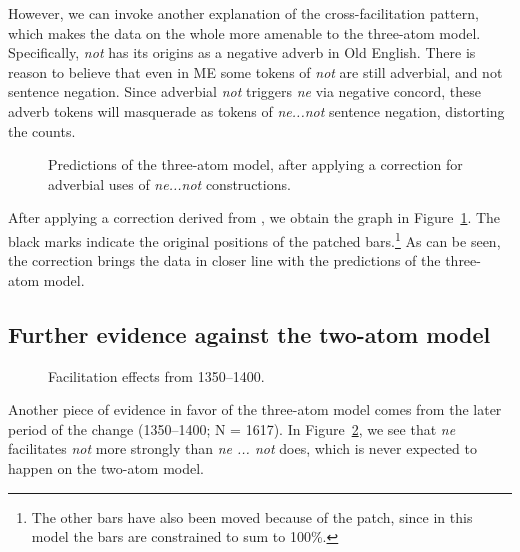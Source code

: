 \documentclass{article}
\begin{document}
However, we can invoke another explanation of the cross-facilitation
pattern, which makes the data on the whole more amenable to the
three-atom model.  Specifically, \emph{not} has its origins as a
negative adverb in Old English.  There is reason to believe that even in
ME some tokens of \emph{not} are still adverbial, and not sentence
negation.  Since adverbial \emph{not} triggers \emph{ne} via negative
concord, these adverb tokens will masquerade as tokens of
\emph{ne...not} sentence negation, distorting the counts.


\begin{figure}
    \centering
    
    \caption{Predictions of the three-atom model, after applying a correction for adverbial uses of \emph{ne...not} constructions.}
    \label{fig:patch}
\end{figure}

After applying a correction derived from \textcite{Frisch1997}, we
obtain the graph in Figure~\ref{fig:patch}.  The black marks indicate
the original positions of the patched bars.\footnote{The other bars have
also been moved because of the patch, since in this model the bars are
constrained to sum to 100\%.}  As can be seen, the correction brings the
data in closer line with the predictions of the three-atom model.

\subsection{Further evidence against the two-atom model}
\label{sec:furth-evid-against}

\begin{figure}
    \centering
    
    \caption{Facilitation effects from 1350–1400.}
    \label{fig:later-evid}
\end{figure}

Another piece of evidence in favor of the three-atom model comes from
the later period of the change (1350–1400; N = 1617).  In
Figure~\ref{fig:later-evid}, we see that \emph{ne} facilitates
\emph{not} more strongly than \emph{ne ... not} does, which is never
expected to happen on the two-atom model.
\end{document}
